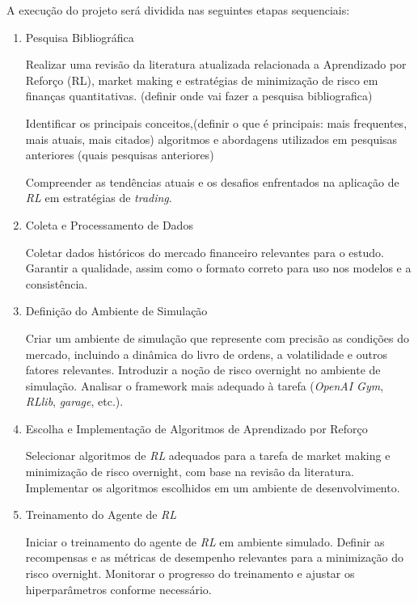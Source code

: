 
A execução do projeto será dividida nas seguintes etapas sequenciais:

\begin{enumerate}

\item Pesquisa Bibliográfica \label{item:bibliography_review}

Realizar uma revisão da literatura atualizada relacionada a Aprendizado por Reforço (RL), market making e estratégias de minimização de risco em finanças quantitativas. (definir onde vai fazer a pesquisa bibliografica)

Identificar os principais conceitos,(definir o que é principais: mais frequentes, mais atuais, mais citados) algoritmos e abordagens utilizados em pesquisas anteriores (quais pesquisas anteriores)

Compreender as tendências atuais e os desafios enfrentados na aplicação de \textit{RL} em estratégias de \textit{trading}.

\item Coleta e Processamento de Dados \label{item:data}

Coletar dados históricos do mercado financeiro relevantes para o estudo.
Garantir a qualidade, assim como o formato correto para uso nos modelos e a consistência.

\item Definição do Ambiente de Simulação \label{item:environment}

Criar um ambiente de simulação que represente com precisão as condições do mercado, incluindo a dinâmica do livro de ordens, a volatilidade e outros fatores relevantes. Introduzir a noção de risco overnight no ambiente de simulação. Analisar o framework mais adequado à tarefa (\textit{OpenAI Gym}, \textit{RLlib}, \textit{garage}, etc.).

\item Escolha e Implementação de Algoritmos de Aprendizado por Reforço \label{item:agent}

Selecionar algoritmos de \textit{RL} adequados para a tarefa de market making e minimização de risco overnight, com base na revisão da literatura. Implementar os algoritmos escolhidos em um ambiente de desenvolvimento.

\item Treinamento do Agente de \textit{RL} \label{item:training}

Iniciar o treinamento do agente de \textit{RL} em ambiente simulado. Definir as recompensas e as métricas de desempenho relevantes para a minimização do risco overnight. Monitorar o progresso do treinamento e ajustar os hiperparâmetros conforme necessário.


\end{enumerate}
